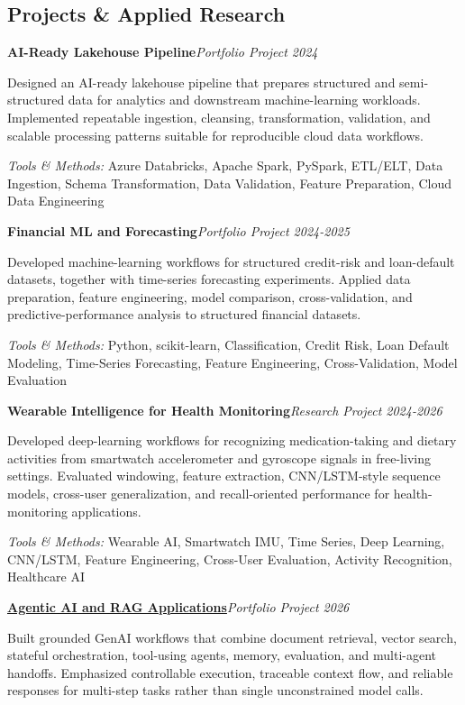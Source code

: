\documentclass[9pt,letterpaper]{extarticle}
\newcommand{\entry}[2]{\Needspace{4\baselineskip}\textbf{#1}\hfill\textit{#2}\par}
\begin{document}
\subsection{Projects \& Applied Research}
\entry{AI-Ready Lakehouse Pipeline}{Portfolio Project \textbar{} 2024}
Designed an AI-ready lakehouse pipeline that prepares structured and semi-structured data for analytics and downstream machine-learning workloads. Implemented repeatable ingestion, cleansing, transformation, validation, and scalable processing patterns suitable for reproducible cloud data workflows.\par
{\small\textit{Tools \& Methods:} Azure Databricks, Apache Spark, PySpark, ETL/ELT, Data Ingestion, Schema Transformation, Data Validation, Feature Preparation, Cloud Data Engineering\par}
\vspace{1pt}
\entry{Financial ML and Forecasting}{Portfolio Project \textbar{} 2024-2025}
Developed machine-learning workflows for structured credit-risk and loan-default datasets, together with time-series forecasting experiments. Applied data preparation, feature engineering, model comparison, cross-validation, and predictive-performance analysis to structured financial datasets.\par
{\small\textit{Tools \& Methods:} Python, scikit-learn, Classification, Credit Risk, Loan Default Modeling, Time-Series Forecasting, Feature Engineering, Cross-Validation, Model Evaluation\par}
\vspace{1pt}
\entry{Wearable Intelligence for Health Monitoring}{Research Project \textbar{} 2024-2026}
Developed deep-learning workflows for recognizing medication-taking and dietary activities from smartwatch accelerometer and gyroscope signals in free-living settings. Evaluated windowing, feature extraction, CNN/LSTM-style sequence models, cross-user generalization, and recall-oriented performance for health-monitoring applications.\par
{\small\textit{Tools \& Methods:} Wearable AI, Smartwatch IMU, Time Series, Deep Learning, CNN/LSTM, Feature Engineering, Cross-User Evaluation, Activity Recognition, Healthcare AI\par}
\vspace{1pt}
\entry{\href{https://github.com/WaseemRaza844/agentic-ai-projects-by-was}{Agentic AI and RAG Applications}}{Portfolio Project \textbar{} 2026}
Built grounded GenAI workflows that combine document retrieval, vector search, stateful orchestration, tool-using agents, memory, evaluation, and multi-agent handoffs. Emphasized controllable execution, traceable context flow, and reliable responses for multi-step tasks rather than single unconstrained model calls.\par
\end{document}
